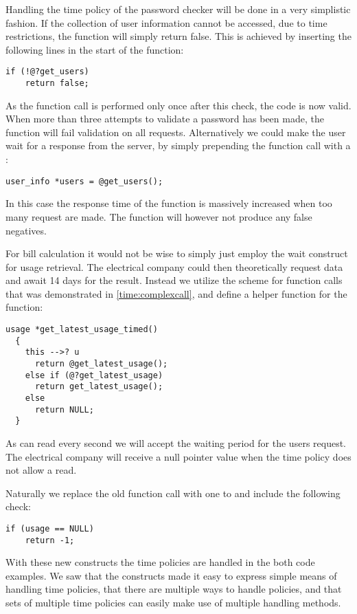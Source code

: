 Handling the time policy of the password checker will be done in a very simplistic fashion.
If the collection of user information cannot be accessed, due to time restrictions, the function will simply return false.
This is achieved by inserting the following lines in the start of the function:

\begin{lstlisting}[style=dlmc]
  if (!@?get_users)
    return false;
\end{lstlisting}

As the  function call is performed only once after this check, the code is now valid.
When more than three attempts to validate a password has been made, the function will fail validation on all requests.
Alternatively we could make the user wait for a response from the server, by simply prepending the  function call with a :

\begin{lstlisting}[style=dlmc]
  user_info *users = @get_users();
\end{lstlisting}

In this case the response time of the function is massively increased when too many request are made.
The function will however not produce any false negatives.

For bill calculation it would not be wise to simply just employ the  wait construct for usage retrieval.
The electrical company could then theoretically request data and await 14 days for the result.
Instead we utilize the scheme for function calls that was demonstrated in \cref{time:complexcall}, and define a helper function for the  function:

\begin{lstlisting}[style=dlmc]
  usage *get_latest_usage_timed()
  {
    this -->? u
      return @get_latest_usage();
    else if (@?get_latest_usage)
      return get_latest_usage();
    else
      return NULL;
  }
\end{lstlisting}

As  can read every second we will accept the waiting period for the users request.
The electrical company will receive a null pointer value when the time policy does not allow a read.

Naturally we replace the old  function call with one to  and include the following check:
\begin{lstlisting}[style=dlmc]
  if (usage == NULL)
    return -1;
\end{lstlisting}

With these new constructs the time policies are handled in the both code examples.
We saw that the constructs made it easy to express simple means of handling time policies, that there are multiple ways to handle policies, and that sets of multiple time policies can easily make use of multiple handling methods.

